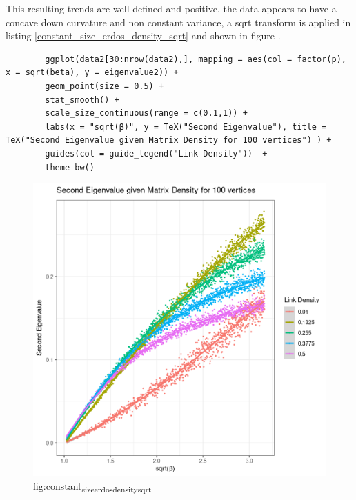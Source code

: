 \documentclass[11pt]{report}
\begin{document}
This resulting trends are well defined and positive, the data appears to have a
concave down curvature and non constant variance, a sqrt transform is applied in
listing \ref{constant_size_erdos_density_sqrt} and shown in figure .


\begin{listing}[htbp]
    \begin{tcolorbox}
        \begin{verbatim}
        ggplot(data2[30:nrow(data2),], mapping = aes(col = factor(p), x = sqrt(beta), y = eigenvalue2)) +
        geom_point(size = 0.5) +
        stat_smooth() +
        scale_size_continuous(range = c(0.1,1)) +
        labs(x = "sqrt(β)", y = TeX("Second Eigenvalue"), title = TeX("Second Eigenvalue given Matrix Density for 100 vertices") ) +
        guides(col = guide_legend("Link Density"))  +
        theme_bw()
        \end{verbatim}
    \end{tcolorbox}
\caption{\label{constant_size_erdos_density_sqrt}listing:constant\textsubscript{size}\textsubscript{erdos}\textsubscript{density}\textsubscript{sqrt}}
\end{listing}


\begin{figure}[htbp]
\centering
\includegraphics[width=12cm]{media/constant_size_erdos_density_sqrt.png}
\caption{\label{fig:constant_size_erdos_density_sqrt}fig:constant\textsubscript{size}\textsubscript{erdos}\textsubscript{density}\textsubscript{sqrt}}
\end{figure}
\end{document}
